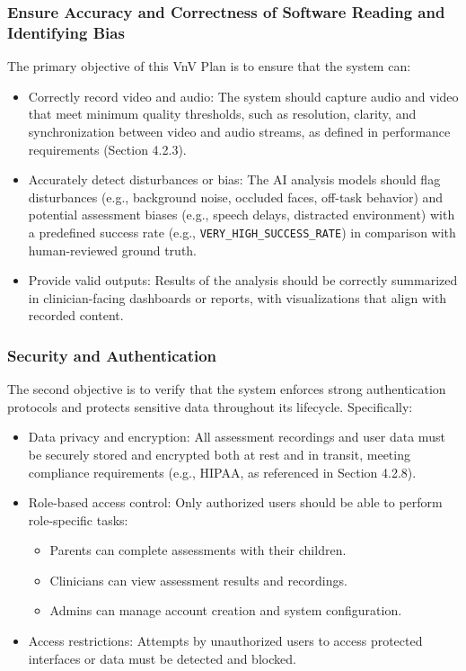 \documentclass[12pt, titlepage]{article}
\begin{document}
\subsubsection{Ensure Accuracy and Correctness of Software Reading and Identifying Bias}
The primary objective of this VnV Plan is to ensure that the system can:
\begin{itemize}
  \item Correctly record video and audio: The system should capture audio and video that meet minimum quality thresholds, such as resolution, clarity, and synchronization between video and audio streams, as defined in performance requirements (Section 4.2.3).
  \item Accurately detect disturbances or bias: The AI analysis models should flag disturbances (e.g., background noise, occluded faces, off-task behavior) and potential assessment biases (e.g., speech delays, distracted environment) with a predefined success rate (e.g., \texttt{VERY\_HIGH\_SUCCESS\_RATE}) in comparison with human-reviewed ground truth.
  \item Provide valid outputs: Results of the analysis should be correctly summarized in clinician-facing dashboards or reports, with visualizations that align with recorded content.
\end{itemize}

\subsubsection{Security and Authentication}
The second objective is to verify that the system enforces strong authentication protocols and protects sensitive data throughout its lifecycle. Specifically:
\begin{itemize}
  \item Data privacy and encryption: All assessment recordings and user data must be securely stored and encrypted both at rest and in transit, meeting compliance requirements (e.g., HIPAA, as referenced in Section 4.2.8).
  \item Role-based access control: Only authorized users should be able to perform role-specific tasks:
    \begin{itemize}
      \item Parents can complete assessments with their children.
      \item Clinicians can view assessment results and recordings.
      \item Admins can manage account creation and system configuration.
    \end{itemize}
  \item Access restrictions: Attempts by unauthorized users to access protected interfaces or data must be detected and blocked.
\end{itemize}
\end{document}
